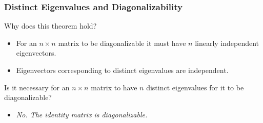 \begin{frame}
\frametitle{Distinct Eigenvalues and Diagonalizability}
    
    \begin{center}\end{center}

    \vspace{6pt} 
    
    \pause
    
    Why does this theorem hold? 
    
    \pause
    \begin{itemize}
        \item  For an $n\times n$ matrix to be diagonalizable it must have $n$ linearly independent eigenvectors. 
        \item \pause Eigenvectors corresponding to distinct eigenvalues are independent. 
    \end{itemize}
    
    \pause 
    
    Is it necessary for an $n \times n$ matrix to have $n$ distinct eigenvalues for it to be diagonalizable? 
    
    \pause
    \begin{itemize}
        \item[] \textit{No. The identity matrix is diagonalizable.}
    \end{itemize}

\end{frame}

